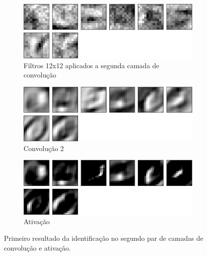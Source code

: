 \documentclass[
	12pt,				%
	oneside,			%
	a4paper,			%
	english,			%
	french,				%
	spanish,			%
	brazil,				%
	]{abntex2}
\begin{document}
\begin{center}
\begin{figure}
\begin{subfigure}{.8\textwidth}
	\centering
	\includegraphics[width=.6\linewidth]{images/fabio/resultados/network_3/filter_convolution2d_2}%
	\caption{Filtros 12x12 aplicados a segunda camada de convolução}		
	\label{fig:filtros12x12}	
\end{subfigure}%

\begin{subfigure}{.8\textwidth}
	\centering
	\includegraphics[width=.6\linewidth]{images/fabio/resultados/network_3/input_1_layer_convolution2d_2}
	\caption{Convolução 2}
\end{subfigure}%

\begin{subfigure}{.8\textwidth}
	\centering
	\includegraphics[width=.6\linewidth]{images/fabio/resultados/network_3/input_1_layer_activation_2}%
	\caption{Ativação}			
\end{subfigure}%
\label{fig:camada_2}
\caption{Primeiro resultado da identificação no segundo par de camadas de convolução e ativação.}
\end{figure}
\end{center}
\end{document}
